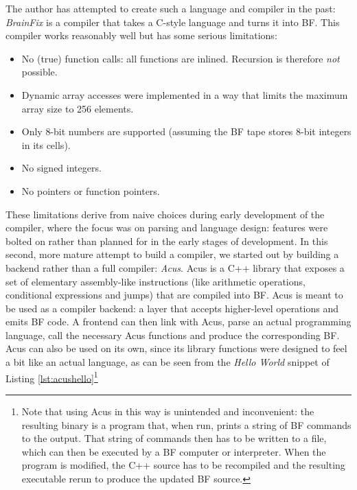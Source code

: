 The author has attempted to create such a language and compiler in the past: \emph{BrainFix} \cite{brainfix} is a compiler that takes a C-style language and turns it into BF. This compiler works reasonably well but has some serious limitations:
\begin{itemize}\itemsep0em 
\item No (true) function calls: all functions are inlined. Recursion is therefore \emph{not} possible.
\item Dynamic array accesses were implemented in a way that limits the maximum array size to 256 elements.
\item Only 8-bit numbers are supported (assuming the BF tape stores 8-bit integers in its cells).
\item No signed integers.
\item No pointers or function pointers.
\end{itemize}
%
These limitations derive from naive choices during early development of the compiler, where the focus was on parsing and language design: features were bolted on rather than planned for in the early stages of development. In this second, more mature attempt to build a compiler, we started out by building a backend rather than a full compiler: \emph{Acus}. Acus is a C++ library that exposes a set of elementary assembly-like instructions (like arithmetic operations, conditional expressions and jumps) that are compiled into BF. Acus is meant to be used as a compiler backend: a layer that accepts higher-level operations and emits BF code. A frontend can then link with Acus, parse an actual programming language, call the necessary Acus functions and produce the corresponding BF. Acus can also be used on its own, since its library functions were designed to feel a bit like an actual language, as can be seen from the \emph{Hello World} snippet of Listing \ref{lst:acushello}\footnote{Note that using Acus in this way is unintended and inconvenient: the resulting binary is a program that, when run, prints a string of BF commands to the output. That string of commands then has to be written to a file, which can then be executed by a BF computer or interpreter. When the program is modified, the C++ source has to be recompiled and the resulting executable rerun to produce the updated BF source.}

